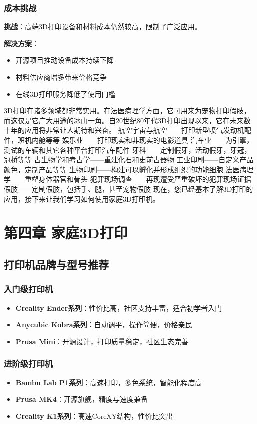 \documentclass[12pt,UTF8]{ctexbook}
\begin{document}
\subsection{成本挑战}
\textbf{挑战}：高端3D打印设备和材料成本仍然较高，限制了广泛应用。

\textbf{解决方案}：
\begin{itemize}
\item 开源项目推动设备成本持续下降
\item 材料供应商增多带来价格竞争
\item 在线3D打印服务降低了使用门槛
\end{itemize}

3D打印在诸多领域都非常实用。在法医病理学方面，它可用来为宠物打印假肢，而这仅是它广大用途的冰山一角。自20世纪80年代3D打印出现以来，它在未来数十年的应用将非常让人期待和兴奋。
航空宇宙与航空——打印新型喷气发动机配件，班机内舱等等
娱乐业——打印现实和非现实的电影道具
汽车业——为引擎，测试的车辆和其它各种平台打印汽车配件
牙科——定制假牙，活动假牙，牙冠，冠桥等等
古生物学和考古学——重建化石和史前古器物
工业印刷——自定义产品颜色，定制产品等等
生物印刷——构建可以孵化并形成组织的功能细胞
法医病理学——重塑身体器官和骨头
犯罪现场调查——再现遭受严重破坏的犯罪现场证据
假肢——定制假肢，包括手、腿，甚至宠物假肢
现在，您已经基本了解3D打印的应用，接下来让我们学习如何使用家庭3D打印机。

\chapter{第四章 家庭3D打印}

\section{打印机品牌与型号推荐}

\subsection{入门级打印机}
\begin{itemize}
\item \textbf{Creality Ender系列}：性价比高，社区支持丰富，适合初学者入门
\item \textbf{Anycubic Kobra系列}：自动调平，操作简便，价格亲民
\item \textbf{Prusa Mini}：开源设计，打印质量稳定，社区生态完善
\end{itemize}

\subsection{进阶级打印机}
\begin{itemize}
\item \textbf{Bambu Lab P1系列}：高速打印，多色系统，智能化程度高
\item \textbf{Prusa MK4}：开源旗舰，精度与速度兼备
\item \textbf{Creality K1系列}：高速CoreXY结构，性价比突出
\end{itemize}
\end{document}
